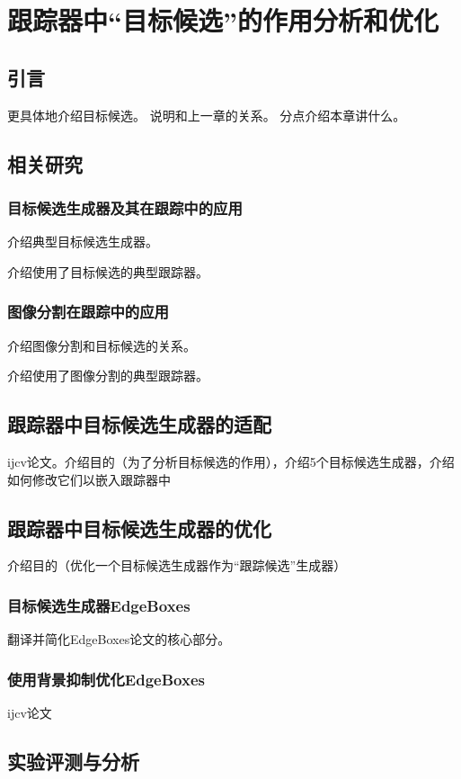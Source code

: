 \chapter{跟踪器中``目标候选''的作用分析和优化}
\label{chapijcv}

\section{引言}
更具体地介绍目标候选。
说明和上一章的关系。
分点介绍本章讲什么。

\section{相关研究}
\subsection{目标候选生成器及其在跟踪中的应用}
介绍典型目标候选生成器。

介绍使用了目标候选的典型跟踪器。
\subsection{图像分割在跟踪中的应用}
介绍图像分割和目标候选的关系。

介绍使用了图像分割的典型跟踪器。

\section{跟踪器中目标候选生成器的适配}
ijcv论文。介绍目的（为了分析目标候选的作用），介绍5个目标候选生成器，介绍如何修改它们以嵌入跟踪器中

\section{跟踪器中目标候选生成器的优化}
介绍目的（优化一个目标候选生成器作为``跟踪候选''生成器）
\subsection{目标候选生成器EdgeBoxes}
翻译并简化EdgeBoxes论文的核心部分。
\subsection{使用背景抑制优化EdgeBoxes}
ijcv论文


\section{实验评测与分析}
